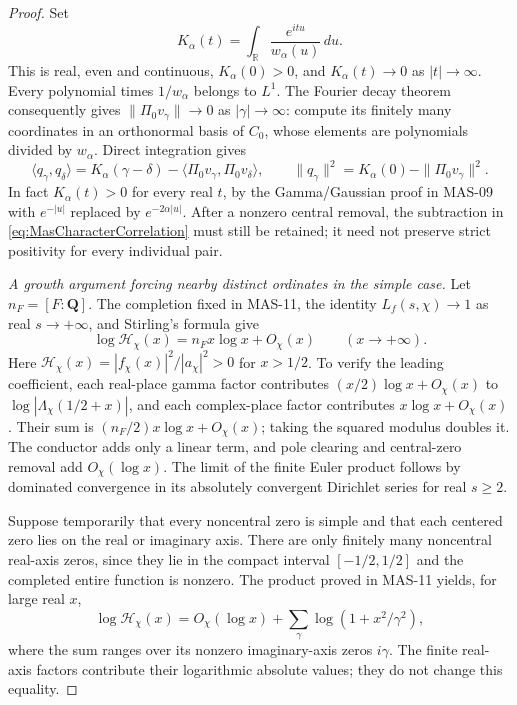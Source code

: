 \documentclass[11pt,a4paper]{article}
\newcommand{\R}{\mathbb R}
\newcommand{\fid}[1]{\textsf{#1}}
\begin{document}
\begin{proof}
Set
\[
 K_\alpha(t)=\int_\R\frac{e^{itu}}{w_\alpha(u)}\,du.
\]
This is real, even and continuous, $K_\alpha(0)>0$, and $K_\alpha(t)\to0$ as $|t|\to\infty$. Every polynomial times $1/w_\alpha$ belongs to $L^1$. The Fourier decay theorem consequently gives $\|\Pi_0v_\gamma\|\to0$ as $|\gamma|\to\infty$: compute its finitely many coordinates in an orthonormal basis of $C_0$, whose elements are polynomials divided by $w_\alpha$. Direct integration gives
\begin{equation}\label{eq:MasCharacterCorrelation}
 \langle q_\gamma,q_\delta\rangle
 =K_\alpha(\gamma-\delta)
  -\langle\Pi_0v_\gamma,\Pi_0v_\delta\rangle,
 \qquad
 \|q_\gamma\|^2=K_\alpha(0)-\|\Pi_0v_\gamma\|^2.
\end{equation}
In fact $K_\alpha(t)>0$ for every real $t$, by the Gamma/Gaussian proof in \fid{MAS-09} with $e^{-|u|}$ replaced by $e^{-2\alpha|u|}$. After a nonzero central removal, the subtraction in \eqref{eq:MasCharacterCorrelation} must still be retained; it need not preserve strict positivity for every individual pair.

\emph{A growth argument forcing nearby distinct ordinates in the simple case.}
Let $n_F=[F:\mathbf Q]$. The completion fixed in \fid{MAS-11}, the identity $L_f(s,\chi)\to1$ as real $s\to+\infty$, and Stirling's formula \cite[(5.11.1)]{dlmf511} give
\begin{equation}\label{eq:MasCharacterRealGrowth}
 \log\mathcal H_\chi(x)=n_F x\log x+O_\chi(x)
 \qquad(x\to+\infty).
\end{equation}
Here $\mathcal H_\chi(x)=|f_\chi(x)|^2/|a_\chi|^2>0$ for $x>1/2$. To verify the leading coefficient, each real-place gamma factor contributes $(x/2)\log x+O_\chi(x)$ to $\log|\Lambda_\chi(1/2+x)|$, and each complex-place factor contributes $x\log x+O_\chi(x)$. Their sum is $(n_F/2)x\log x+O_\chi(x)$; taking the squared modulus doubles it. The conductor adds only a linear term, and pole clearing and central-zero removal add $O_\chi(\log x)$. The limit of the finite Euler product follows by dominated convergence in its absolutely convergent Dirichlet series for real $s\ge2$.

Suppose temporarily that every noncentral zero is simple and that each centered zero lies on the real or imaginary axis. There are only finitely many noncentral real-axis zeros, since they lie in the compact interval $[-1/2,1/2]$ and the completed entire function is nonzero. The product proved in \fid{MAS-11} yields, for large real $x$,
\[
 \log\mathcal H_\chi(x)
 =O_\chi(\log x)
  +\sum_{\gamma}\log(1+x^2/\gamma^2),
\]
where the sum ranges over its nonzero imaginary-axis zeros $i\gamma$. The finite real-axis factors contribute their logarithmic absolute values; they do not change this equality.


\end{proof}
\end{document}
